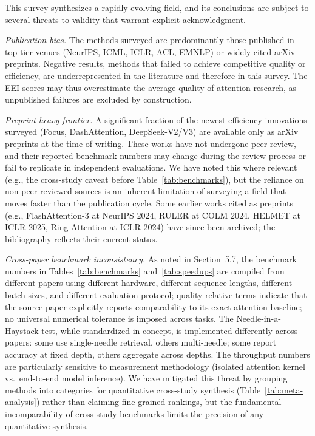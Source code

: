 \documentclass[10pt,twocolumn]{article}
\begin{document}
This survey synthesizes a rapidly evolving field, and its conclusions are subject to several threats to validity that warrant explicit acknowledgment.

\textit{Publication bias.} The methods surveyed are predominantly those published in top-tier venues (NeurIPS, ICML, ICLR, ACL, EMNLP) or widely cited arXiv preprints. Negative results, methods that failed to achieve competitive quality or efficiency, are underrepresented in the literature and therefore in this survey. The EEI scores may thus overestimate the average quality of attention research, as unpublished failures are excluded by construction.

\textit{Preprint-heavy frontier.} A significant fraction of the newest efficiency innovations surveyed (Focus, DashAttention, DeepSeek-V2/V3) are available only as arXiv preprints at the time of writing. These works have not undergone peer review, and their reported benchmark numbers may change during the review process or fail to replicate in independent evaluations. We have noted this where relevant (e.g., the cross-study caveat before Table~\ref{tab:benchmarks}), but the reliance on non-peer-reviewed sources is an inherent limitation of surveying a field that moves faster than the publication cycle. Some earlier works cited as preprints (e.g., FlashAttention-3 at NeurIPS 2024, RULER at COLM 2024, HELMET at ICLR 2025, Ring Attention at ICLR 2024) have since been archived; the bibliography reflects their current status.

\textit{Cross-paper benchmark inconsistency.} As noted in Section~5.7, the benchmark numbers in Tables~\ref{tab:benchmarks} and~\ref{tab:speedups} are compiled from different papers using different hardware, different sequence lengths, different batch sizes, and different evaluation protocol; quality-relative terms indicate that the source paper explicitly reports comparability to its exact-attention baseline; no universal numerical tolerance is imposed across tasks. The Needle-in-a-Haystack test, while standardized in concept, is implemented differently across papers: some use single-needle retrieval, others multi-needle; some report accuracy at fixed depth, others aggregate across depths. The throughput numbers are particularly sensitive to measurement methodology (isolated attention kernel vs.\ end-to-end model inference). We have mitigated this threat by grouping methods into categories for quantitative cross-study synthesis (Table~\ref{tab:meta-analysis}) rather than claiming fine-grained rankings, but the fundamental incomparability of cross-study benchmarks limits the precision of any quantitative synthesis.
\end{document}
